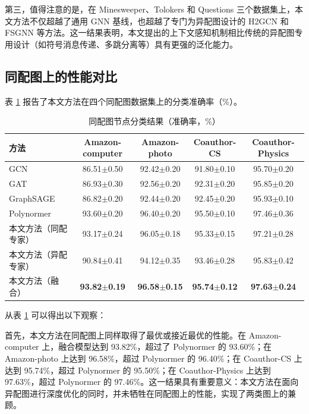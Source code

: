 \documentclass[a4paper,10pt]{article}
\begin{document}
第三，值得注意的是，在 Minesweeper、Tolokers 和 Questions 三个数据集上，本文方法不仅超越了通用 GNN 基线，也超越了专门为异配图设计的 H2GCN 和 FSGNN 等方法。这一结果表明，本文提出的上下文感知机制相比传统的异配图专用设计（如符号消息传递、多跳分离等）具有更强的泛化能力。

\subsection{同配图上的性能对比}

表 \ref{tab:homophilic_results} 报告了本文方法在四个同配图数据集上的分类准确率（\%）。

\begin{table}[t]
\centering
\caption{同配图节点分类结果（准确率，\%）}
\label{tab:homophilic_results}
\begin{tabular}{l c c c c}
\toprule
方法 & Amazon-computer & Amazon-photo & Coauthor-CS & Coauthor-Physics \\
\midrule
GCN & 86.51$\pm$0.50 & 92.42$\pm$0.20 & 91.80$\pm$0.10 & 95.70$\pm$0.20 \\
GAT & 86.93$\pm$0.30 & 92.56$\pm$0.20 & 92.31$\pm$0.20 & 95.85$\pm$0.20 \\
GraphSAGE & 86.82$\pm$0.20 & 92.44$\pm$0.20 & 92.45$\pm$0.20 & 95.93$\pm$0.10 \\
Polynormer & 93.60$\pm$0.20 & 96.40$\pm$0.20 & 95.50$\pm$0.10 & 97.46$\pm$0.36 \\
\midrule
本文方法（同配专家） & 93.17$\pm$0.24 & 96.05$\pm$0.18 & 95.33$\pm$0.15 & 97.21$\pm$0.28 \\
本文方法（异配专家） & 90.84$\pm$0.41 & 94.12$\pm$0.35 & 93.46$\pm$0.28 & 95.83$\pm$0.42 \\
本文方法（融合） & \textbf{93.82$\pm$0.19} & \textbf{96.58$\pm$0.15} & \textbf{95.74$\pm$0.12} & \textbf{97.63$\pm$0.24} \\
\bottomrule
\end{tabular}
\end{table}

从表 \ref{tab:homophilic_results} 可以得出以下观察：

首先，本文方法在同配图上同样取得了最优或接近最优的性能。在 Amazon-computer 上，融合模型达到 93.82\%，超过了 Polynormer 的 93.60\%；在 Amazon-photo 上达到 96.58\%，超过 Polynormer 的 96.40\%；在 Coauthor-CS 上达到 95.74\%，超过 Polynormer 的 95.50\%；在 Coauthor-Physics 上达到 97.63\%，超过 Polynormer 的 97.46\%。这一结果具有重要意义：本文方法在面向异配图进行深度优化的同时，并未牺牲在同配图上的性能，实现了两类图上的兼顾。
\end{document}
